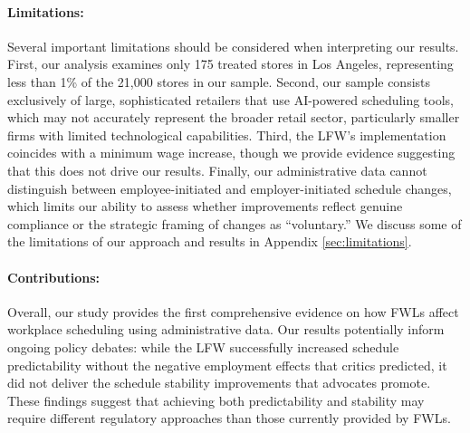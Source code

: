 \documentclass[letterpaper,11pt,leqno]{article}
\theoremstyle{paper}
\begin{document}
\paragraph{Limitations:} Several important limitations should be considered when interpreting our results. First, our analysis examines only 175 treated stores in Los Angeles, representing less than 1\% of the 21,000 stores in our sample. Second, our sample consists exclusively of large, sophisticated retailers that use AI-powered scheduling tools, which may not accurately represent the broader retail sector, particularly smaller firms with limited technological capabilities. Third, the LFW's implementation coincides with a minimum wage increase, though we provide evidence suggesting that this does not drive our results. Finally, our administrative data cannot distinguish between employee-initiated and employer-initiated schedule changes, which limits our ability to assess whether improvements reflect genuine compliance or the strategic framing of changes as ``voluntary.'' We discuss some of the limitations of our approach and results in Appendix \ref{sec:limitations}.

\paragraph{Contributions:}
Overall, our study provides the first comprehensive evidence on how FWLs affect workplace scheduling using administrative data. Our results potentially inform ongoing policy debates: while the LFW successfully increased schedule predictability without the negative employment effects that critics predicted, it did not deliver the schedule stability improvements that advocates promote. These findings suggest that achieving both predictability and stability may require different regulatory approaches than those currently provided by FWLs.
\end{document}

